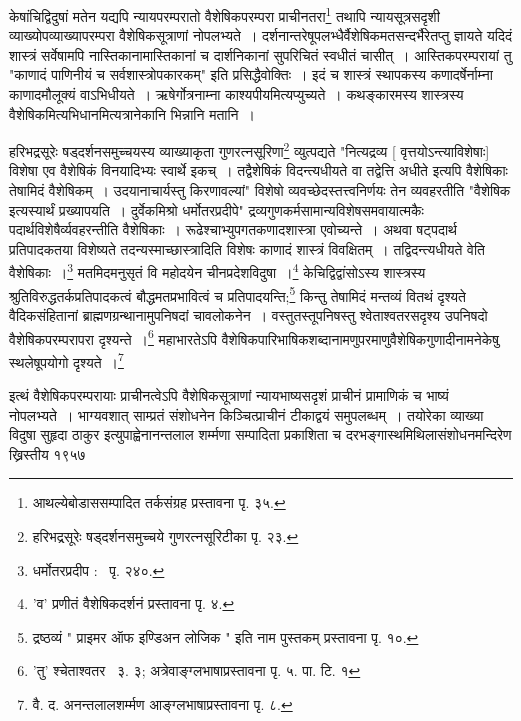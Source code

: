 \documentclass[11pt, openany]{book}
\begin{document}
\newpage
केषांचिद्विदुषां मतेन यद्यपि न्यायपरम्परातो वैशेषिकपरम्परा प्राचीनतरा\renewcommand{\thefootnote}{१९}\footnote{आथल्येबोडाससम्पादित तर्कसंग्रह प्रस्तावना पृ. ३५.} तथापि न्यायसूत्रसदृशी व्याख्योपव्याख्यापरम्परा वैशेषिकसूत्राणां नोपलभ्यते~। दर्शनान्तरेषूपलभ्धैर्वैशेषिकमतसन्दर्भैरेतप्तु ज्ञायते यदिदं शास्त्रं सर्वेषामपि नास्तिकानामास्तिकानां च दार्शनिकानां सुपरिचितं स्वधीतं चासीत्~। आस्तिकपरम्परायां तु "{\knu काणादं पाणिनी}यं च सर्वशास्त्रोपकारकम्" इति प्रसिद्धैवोक्तिः~। इदं च शास्त्रं स्थापकस्य {\knu कणाद}र्षेर्नाम्ना {\knu काणादमौलूक्यं} वाऽभिधीयते~। ऋषेर्गोत्रनाम्ना {\knu काश्यपी}यमित्यप्युच्यते~। कथङ्कारमस्य शास्त्रस्य {\knu वैशेषिक}मित्यभिधानमित्यत्रानेकानि भिन्नानि मतानि~।

{\knu हरिभद्रसूरेः षड्दर्शनसमुच्चयस्य} व्याख्याकृता गुणरत्नसूरिणा\renewcommand{\thefootnote}{२०}\footnote{हरिभद्रसूरेः षड्दर्शनसमुच्चये गुणरत्नसूरिटीका पृ. २३.} व्युत्पद्यते "नित्यद्रव्य [ वृत्तयोऽन्त्याविशेषाः] विशेषा एव वैशेषिकं विनयादिभ्यः स्वार्थे इकच्~। तद्वैशेषिकं विदन्त्यधीयते वा तद्वेत्ति अधीते इत्यपि वैशेषिकाः तेषामिदं {\knu वैशेषिकम्}~। उदयानाचार्यस्तु किरणावल्यां" विशेषो व्यवच्छेदस्तत्त्वनिर्णयः तेन व्यवहरतीति "वैशेषिक इत्यस्यार्थं प्रख्यापयति~। दुर्वेकमिश्रो धर्मोतरप्रदीपे" द्रव्यगुणकर्मसामान्यविशेषसमवायात्मकैः पदार्थविशेषैर्व्यवहरन्तीति वैशेषिकाः~। रूढेश्चाभ्युपगतकणादशास्त्रा एवोच्यन्ते~। अथवा षट्पदार्थ प्रतिपादकतया विशेष्यते तदन्यस्माच्छास्त्रादिति विशेषः {\knu काणादं} शास्त्रं विवक्षितम्~। तद्विदन्त्यधीयते वेति वैशेषिकाः~।\renewcommand{\thefootnote}{२१}\footnote{धर्मोतरप्रदीप : \textendash\ पृ. २४०.} मतमिदमनुसृतं वि महोदयेन चीनप्रदेशविदुषा~।\renewcommand{\thefootnote}{२२}\footnote{'व' प्रणीतं वैशेषिकदर्शनं प्रस्तावना पृ. ४.} केचिद्विद्वांसोऽस्य शास्त्रस्य श्रुतिविरुद्धतर्कप्रतिपादकत्वं बौद्धमतप्रभावित्वं च प्रतिपादयन्ति;\renewcommand{\thefootnote}{२३}\footnote{द्रष्ठव्यं " प्राइमर ऑफ इण्डिअन लोजिक " इति नाम पुस्तकम् प्रस्तावना पृ. १०.} किन्तु तेषामिदं मन्तव्यं वितथं दृश्यते वैदिकसंहितानां ब्राह्मणग्रन्थानामुपनिषदां चावलोकनेन~। वस्तुतस्तूपनिषस्तु श्वेताश्वतरसदृश्य उपनिषदो वैशेषिकपरम्परापरा दृश्यन्ते~।\renewcommand{\thefootnote}{२४}\footnote{'तु' श्चेताश्वतर \textendash\ ३. ३; अत्रेवाङ्ग्लभाषाप्रस्तावना पृ. ५. पा. टि. १} {\knu महाभारते}ऽपि वैशेषिकपारिभाषिकशब्दानामणुपरमाणुवैशेषिकगुणादीनामनेकेषु स्थलेषूपयोगो दृश्यते~।\renewcommand{\thefootnote}{२५}\footnote{वै. द. अनन्तलालशर्म्मण आङ्ग्लभाषाप्रस्तावना पृ. ८.}

इत्थं वैशेषिकपरम्परायाः प्राचीनत्वेऽपि वैशेषिकसूत्राणां न्यायभाष्यसदृशं प्राचीनं प्रामाणिकं च भाष्यं नोपलभ्यते~। भाग्यवशात् साम्प्रतं संशोधनेन किञ्चित्प्राचीनं टीकाद्वयं समुपलब्धम्~। तयोरेका व्याख्या विदुषा सुहृदा {\knu ठाकुर इत्युपाह्वेनानन्तलाल शर्म्मणा} सम्पादिता प्रकाशिता च {\knu दरभङ्गास्थमिथिलासंशोधनमन्दिरेण} ख्रिस्तीय १९५७ 
\end{document}
